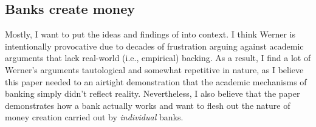 \subsection{Banks create money}

Mostly, I want to put the ideas and findings of \cite{Werner2014} into context.  I think  Werner is intentionally provocative due to decades of frustration arguing against academic arguments that lack real-world (i.e., empirical) backing.  As a result, I find a lot of Werner's arguments tautological and somewhat repetitive in nature, as I believe this paper needed to an airtight demonstration that the academic mechanisms of banking simply didn't reflect reality.  Nevertheless, I also believe that the paper demonstrates how a bank actually works and want to flesh out the nature of money creation carried out by {\it individual} banks.


\subsubsection{}